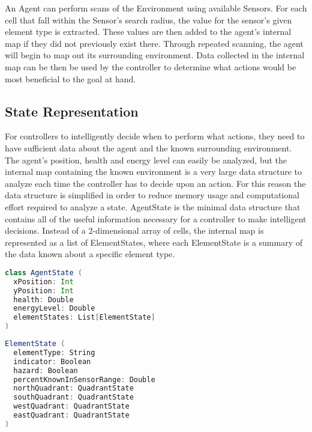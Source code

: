 An Agent can perform scans of the Environment using available Sensors.
For each cell that fall within the Sensor's search radius, the value for the sensor's given element type is extracted.
These values are then added to the agent's internal map if they did not previously exist there.
Through repeated scanning, the agent will begin to map out its surrounding environment.
Data collected in the internal map can be then be used by the controller to determine what actions would be most beneficial to the goal at hand.


\subsection{State Representation}
For controllers to intelligently decide when to perform what actions, they need to have sufficient data about the agent and the known surrounding environment.
The agent's position, health and energy level can easily be analyzed, but the internal map containing the known environment is a very large data structure to analyze each time the controller has to decide upon an action.
For this reason the data structure is simplified in order to reduce memory usage and computational effort required to analyze a state.
AgentState is the minimal data structure that contains all of the useful information necessary for a controller to make intelligent decisions.
Instead of a 2-dimensional array of cells, the internal map is represented as a list of ElementStates, where each ElementState is a summary of the data known about a specific element type.

\begin{lstlisting}[language=Scala]
class AgentState (
  xPosition: Int
  yPosition: Int
  health: Double
  energyLevel: Double
  elementStates: List[ElementState]
)
\end{lstlisting}

\begin{lstlisting}[language=Scala]
ElementState (
  elementType: String
  indicator: Boolean
  hazard: Boolean
  percentKnownInSensorRange: Double
  northQuadrant: QuadrantState
  southQuadrant: QuadrantState
  westQuadrant: QuadrantState
  eastQuadrant: QuadrantState
)
\end{lstlisting}

